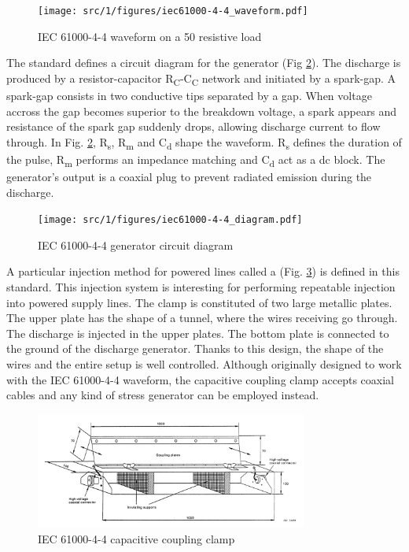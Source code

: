 \begin{figure}[!h]
  \centering
  \texttt{[image: src/1/figures/iec61000-4-4\_waveform.pdf]}
  \caption{IEC 61000-4-4 waveform on a 50\textOmega{} resistive load}
  \label{fig:iec_4_4_pulse}
\end{figure}

The standard defines a circuit diagram for the generator (Fig \ref{fig:iec_4_4_generator}).
The discharge is produced by a resistor-capacitor R\textsubscript{C}-C\textsubscript{C} network and initiated by a spark-gap.
A spark-gap consists in two conductive tips separated by a gap.
When voltage accross the gap becomes superior to the breakdown voltage, a spark appears and resistance of the spark gap suddenly drops, allowing discharge current to flow through.
In Fig. \ref{fig:iec_4_4_generator}, R\textsubscript{s}, R\textsubscript{m} and C\textsubscript{d} shape the waveform.
R\textsubscript{s} defines the duration of the pulse, R\textsubscript{m} performs an impedance matching and C\textsubscript{d} act as a \gls{dc} block.
The generator's output is a coaxial plug to prevent radiated emission during the discharge.

\begin{figure}[!h]
  \centering
  \texttt{[image: src/1/figures/iec61000-4-4\_diagram.pdf]}
  \caption{IEC 61000-4-4 generator circuit diagram}
  \label{fig:iec_4_4_generator}
\end{figure}

A particular injection method for powered lines called a  (Fig. \ref{fig:iec_4_4_clamp}) is defined in this standard.
This injection system is interesting for performing repeatable injection into powered supply lines.
The clamp is constituted of two large metallic plates.
The upper plate has the shape of a tunnel, where the wires receiving go through.
The discharge is injected in the upper plates.
The bottom plate is connected to the ground of the discharge generator.
Thanks to this design, the shape of the wires and the entire setup is well controlled.
Although originally designed to work with the IEC 61000-4-4 waveform, the capacitive coupling clamp accepts coaxial cables and any kind of stress generator can be employed instead.

\begin{figure}[!h]
  \centering
  \includegraphics[width=0.8\textwidth]{src/1/figures/iec61000-4-4_clamp.png}
  \caption{IEC 61000-4-4 capacitive coupling clamp}
  \label{fig:iec_4_4_clamp}
\end{figure}

